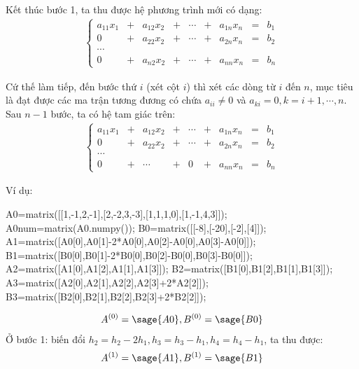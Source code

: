 \documentclass[12pt]{article}
\begin{document}
\newpage{}

Kết thúc bước 1, ta thu được hệ phương trình mới có dạng:
\begin{align*}
\left\lbrace \begin{array}{ccccccccc}
a_{11}x_1 &+& a_{12}x_2 &+& \cdots &+& a_{1n}x_n &=& b_1 \\
0 &+& a_{22}x_2 &+& \cdots &+& a_{2n}x_n &=& b_2 \\
\cdots & & & & &&&&\\
0 &+& a_{n2}x_2 &+& \cdots &+& a_{nn}x_n &=& b_n 
        \end{array}
\right.
\end{align*}

Cứ thế làm tiếp, đến bước thứ $i$ (xét cột $i$) thì xét các dòng từ $i$ đến $n$, mục tiêu là đạt được các ma trận tương đương có chứa $a_{ii} \neq 0$ và $a_{ki}=0, k=i+1,\cdots,n$. 
Sau $n-1$ bước, ta có hệ tam giác trên:
\begin{align*}
\left\lbrace \begin{array}{ccccccccc}
a_{11}x_1 &+& a_{12}x_2 &+& \cdots &+& a_{1n}x_n &=& b_1 \\
0 &+& a_{22}x_2 &+& \cdots &+& a_{2n}x_n &=& b_2 \\
\cdots & & & & &&&&\\
0 &+& \cdots &+& 0 &+& a_{nn}x_n &=& b_n 
        \end{array}
\right.
\end{align*}

\newpage{}

Ví dụ:
\begin{sagesilent}
A0=matrix([[1,-1,2,-1],[2,-2,3,-3],[1,1,1,0],[1,-1,4,3]]);
A0num=matrix(A0.numpy());
B0=matrix([[-8],[-20],[-2],[4]]);
A1=matrix([A0[0],A0[1]-2*A0[0],A0[2]-A0[0],A0[3]-A0[0]]);
B1=matrix([B0[0],B0[1]-2*B0[0],B0[2]-B0[0],B0[3]-B0[0]]);
A2=matrix([A1[0],A1[2],A1[1],A1[3]]);
B2=matrix([B1[0],B1[2],B1[1],B1[3]]);
A3=matrix([A2[0],A2[1],A2[2],A2[3]+2*A2[2]]);
B3=matrix([B2[0],B2[1],B2[2],B2[3]+2*B2[2]]);
\end{sagesilent}
\begin{align}
 A^{(0)}=\sage{A0}, B^{(0)}=\sage{B0}
\end{align}
Ở bước 1: biến đổi $h_2=h_2-2h_1, h_3=h_3-h_1, h_4=h_4-h_1$, ta thu được:
\begin{align}
 A^{(1)}=\sage{A1}, B^{(1)}=\sage{B1}
\end{align}

\newpage{}
\end{document}
